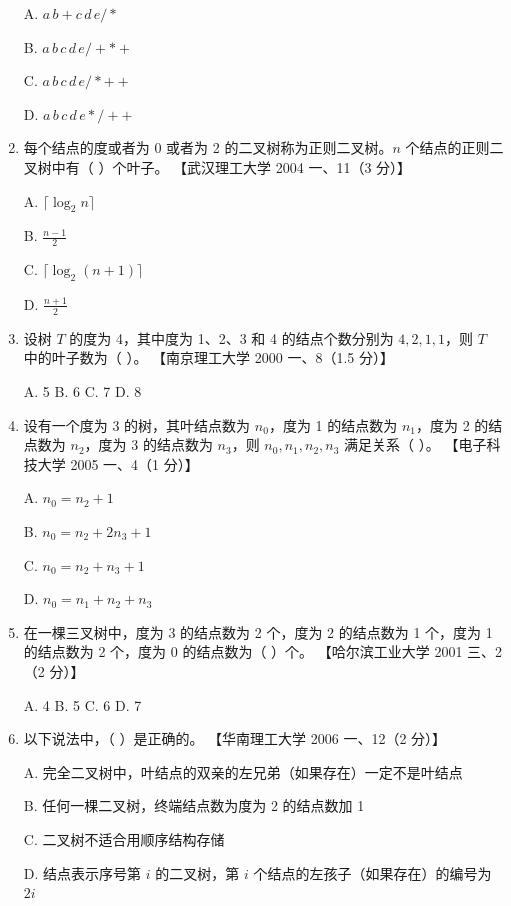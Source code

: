 \documentclass[lang=cn,newtx,10pt,scheme=chinese]{../../elegantbook}
\begin{document}
\begin{enumerate}
    A. $a \, b + c \, d \, e / *$  

    B. $a \, b \, c \, d \, e /+ \ast +$ 

    C. $a \, b \, c \, d \, e / \ast + +$  

    D. $a \, b \, c \, d \, e \ast / + +$  
    \item 每个结点的度或者为 0 或者为 2 的二叉树称为正则二叉树。$n$ 个结点的正则二叉树中有（ ）个叶子。  
    【武汉理工大学 2004 一、11（3 分）】

     A. $\lceil \log_2 n \rceil$  

    B. $\frac{n - 1}{2}$  

    C. $\lceil \log_2 (n + 1) \rceil$  

    D. $\frac{n + 1}{2}$  

    \item 设树 $T$ 的度为 4，其中度为 1、2、3 和 4 的结点个数分别为 $4, 2, 1, 1$，则 $T$ 中的叶子数为（ ）。  
    【南京理工大学 2000 一、8（1.5 分）】  

    A. 5 \quad B. 6 \quad C. 7 \quad D. 8  

    \item 设有一个度为 3 的树，其叶结点数为 $n_0$，度为 1 的结点数为 $n_1$，度为 2 的结点数为 $n_2$，度为 3 的结点数为 $n_3$，则 $n_0, n_1, n_2, n_3$ 满足关系（ ）。  
    【电子科技大学 2005 一、4（1 分）】  

    A. $n_0 = n_2  + 1$ 

    B. $n_0 = n_2 + 2n_3 + 1$  

    C. $n_0 = n_2 + n_3 + 1$  

    D. $n_0 = n_1 + n_2 + n_3$  

    \item 在一棵三叉树中，度为 3 的结点数为 2 个，度为 2 的结点数为 1 个，度为 1 的结点数为 2 个，度为 0 的结点数为（ ）个。  
    【哈尔滨工业大学 2001 三、2（2 分）】  

    A. 4 \quad B. 5 \quad C. 6 \quad D. 7  

    \item 以下说法中，（ ）是正确的。  
    【华南理工大学 2006 一、12（2 分）】  

    A. 完全二叉树中，叶结点的双亲的左兄弟（如果存在）一定不是叶结点  

    B. 任何一棵二叉树，终端结点数为度为 2 的结点数加 1 

    C. 二叉树不适合用顺序结构存储  

    D. 结点表示序号第 $i$ 的二叉树，第 $i$ 个结点的左孩子（如果存在）的编号为 $2i$  


\end{enumerate}
\end{document}
